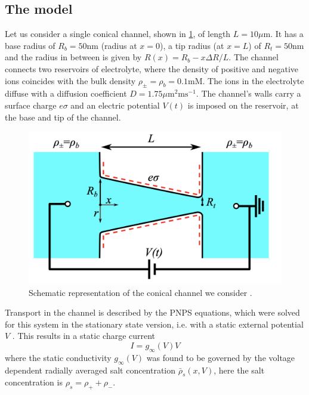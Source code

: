 \documentclass[10.5pt]{article}
\begin{document}
\subsection{The model}

Let us consider a single conical channel, shown in \cref{fig:conical_channel}, of length $L = 10\mu$m. It has a base radius of $R_{b} = 50$nm (radius at $x=0$), a tip radius (at $x=L$) of $R_t = 50$nm and the radius in between is given by $R(x)=R_b-x\Delta R/L$. The channel connects two reservoirs of electrolyte, where the density of positive and negative ions coincides with the bulk density $\rho_{\pm}=\rho_b=0.1$mM. The ions in the electrolyte diffuse with a diffusion coefficient $D=1.75\mu\text{m}^2\text{ms}^{-1}$. The channel's walls carry a surface charge $e\sigma$ and an electric potential $V(t)$ is imposed on the reservoir, at the base and tip of the channel.
\begin{figure}[h]
    \centering
    \includegraphics[width=0.5\columnwidth]{../figures_tex/conical_channel.png}
    \caption{Schematic representation of the conical channel we consider \cite{cone1}.}
    \label{fig:conical_channel}
\end{figure}

Transport in the channel is described by the PNPS equations, which were solved for this system in the stationary state version, i.e. with a static external potential $V$ \cite{cone3}. This results in a static charge current
\[
I = g_{\infty}(V)V
\]
where the static conductivity $g_{\infty}(V)$ was found to be governed by the voltage dependent radially averaged salt concentration $\bar{\rho}_s(x,V)$, here the salt concentration is $\rho_s = \rho_{+} + \rho_{-}$.
\end{document}
